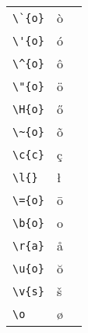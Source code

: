 \documentclass[a4paper,11pt]{article}
\begin{document}
	\begin{tabular}{l | l | l}
		\verb!\`{o}! & ò&\\
		\verb!\'{o}! & ó&\\
		\verb!\^{o}! & ô&\\
		\verb!\"{o}! & ö&\\
		\verb!\H{o}! & ő&\\
		\verb!\~{o}! & õ&\\
		\verb!\c{c}! & ç&\\
		\verb!\l{}! & ł&\\
		\verb!\={o}! & ō&\\
		\verb!\b{o}! & o&\\
		\verb!\r{a}! & å&\\
		\verb!\u{o}! & ŏ&\\
		\verb!\v{s}! & š\\
		\verb!\o! & ø&\\
	\end{tabular}
\end{document}
